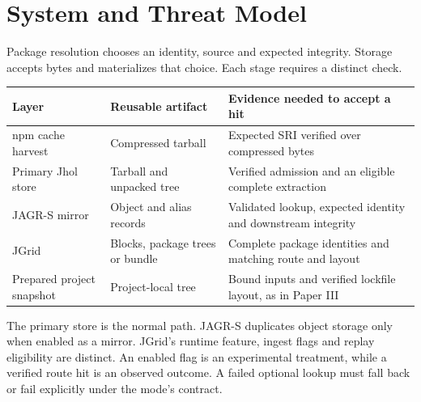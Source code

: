 \documentclass[
  11pt,
  letterpaper,
]{article}
\newcounter{none} %
\begin{document}
\section{System and Threat Model}\label{system-and-threat-model}

Package resolution chooses an identity, source and expected integrity.
Storage accepts bytes and materializes that choice. Each stage requires
a distinct check.

{\def\LTcaptype{none} %
\begin{longtable}[]{@{}
  >{\raggedright\arraybackslash}p{}
  >{\raggedright\arraybackslash}p{}
  >{\raggedright\arraybackslash}p{}@{}}
\toprule\noalign{}
\begin{minipage}[b]{\linewidth}\raggedright
Layer
\end{minipage} & \begin{minipage}[b]{\linewidth}\raggedright
Reusable artifact
\end{minipage} & \begin{minipage}[b]{\linewidth}\raggedright
Evidence needed to accept a hit
\end{minipage} \\
\midrule\noalign{}
\endhead
\bottomrule\noalign{}
\endlastfoot
npm cache harvest & Compressed tarball & Expected SRI verified over
compressed bytes \\
Primary Jhol store & Tarball and unpacked tree & Verified admission and
an eligible complete extraction \\
JAGR-S mirror & Object and alias records & Validated lookup, expected
identity and downstream integrity \\
JGrid & Blocks, package trees or bundle & Complete package identities
and matching route and layout \\
Prepared project snapshot & Project-local tree & Bound inputs and
verified lockfile layout, as in Paper III \\
\end{longtable}
}

The primary store is the normal path. JAGR-S duplicates object storage
only when enabled as a mirror. JGrid's runtime feature, ingest flags and
replay eligibility are distinct. An enabled flag is an experimental
treatment, while a verified route hit is an observed outcome. A failed
optional lookup must fall back or fail explicitly under the mode's
contract.
\end{document}
